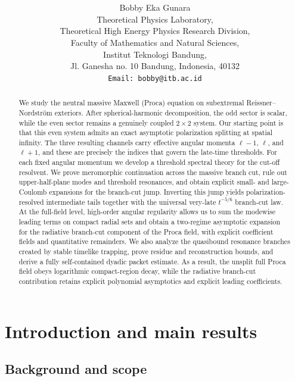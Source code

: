 \documentclass[12pt]{article}
\title{\textbf{\chg{Threshold asymptotics and decay for massive Maxwell on subextremal Reissner--Nordstr\"om}}}
\author{Bobby Eka Gunara\\[1ex]
\small Theoretical Physics Laboratory,\\
\small Theoretical High Energy Physics Research Division,\\
\small Faculty of Mathematics and Natural Sciences,\\
\small Institut Teknologi Bandung,\\
\small Jl. Ganesha no. 10 Bandung, Indonesia, 40132\\[0.5ex]
\small\texttt{Email: bobby@itb.ac.id}}
\date{}
\numberwithin{equation}{section}
\theoremstyle{plain}
\theoremstyle{definition}
\theoremstyle{remark}
\begin{document}
\maketitle


\begin{abstract}

We study the neutral massive Maxwell (Proca) equation on subextremal Reissner--Nordstr\"om exteriors.  After spherical-harmonic decomposition, the odd sector is scalar, while the even sector remains a genuinely coupled $2\times2$ system.  Our starting point is that this even system admits an exact asymptotic polarization splitting at spatial infinity.  The three resulting channels carry effective angular momenta $\ell-1$, $\ell$, and $\ell+1$, and these are precisely the indices that govern the late-time thresholds.
%
For each fixed angular momentum we develop a threshold spectral theory for the cut-off resolvent.  We prove meromorphic continuation across the massive branch cut, rule out upper-half-plane modes and threshold resonances, and obtain explicit small- and large-Coulomb expansions for the branch-cut jump.  Inverting this jump yields polarization-resolved intermediate tails together with the universal very-late $t^{-5/6}$ branch-cut law.
%
At the full-field level, high-order angular regularity allows us to sum the modewise leading terms on compact radial sets and obtain a two-regime asymptotic expansion for the radiative branch-cut component of the Proca field, with explicit coefficient fields and quantitative remainders.  We also analyze the quasibound resonance branches created by stable timelike trapping, prove residue and reconstruction bounds, and derive a fully self-contained dyadic packet estimate.  As a result, the unsplit full Proca field obeys logarithmic compact-region decay, while the radiative branch-cut contribution retains explicit polynomial asymptotics and explicit leading coefficients.

\end{abstract}


\tableofcontents


\section{Introduction and main results}


\subsection{Background and scope}
\end{document}
